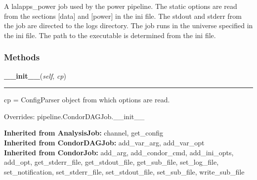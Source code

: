 A lalapps\_power job used by the power pipeline. The static options are 
read from the sections [data] and [power] in the ini file. The stdout and 
stderr from the job are directed to the logs directory. The job runs in 
the universe specified in the ini file. The path to the executable is 
determined from the ini file.



  \subsubsection{Methods}

    \label{power:PowerJob:__init__}
    \vspace{0.5ex}

    \begin{boxedminipage}{\textwidth}

    \raggedright \textbf{\_\_init\_\_}(\textit{self}, \textit{cp})

    \vspace{-1.5ex}

    \rule{\textwidth}{0.5\fboxrule}
    cp = ConfigParser object from which options are read.

    \vspace{1ex}

      Overrides: pipeline.CondorDAGJob.\_\_init\_\_

    \end{boxedminipage}

  \textbf{Inherited from AnalysisJob:}
    channel,
    get\_config
    \\
  \textbf{Inherited from CondorDAGJob:}
    add\_var\_arg,
    add\_var\_opt
    \\
  \textbf{Inherited from CondorJob:}
    add\_arg,
    add\_condor\_cmd,
    add\_ini\_opts,
    add\_opt,
    get\_stderr\_file,
    get\_stdout\_file,
    get\_sub\_file,
    set\_log\_file,
    set\_notification,
    set\_stderr\_file,
    set\_stdout\_file,
    set\_sub\_file,
    write\_sub\_file


